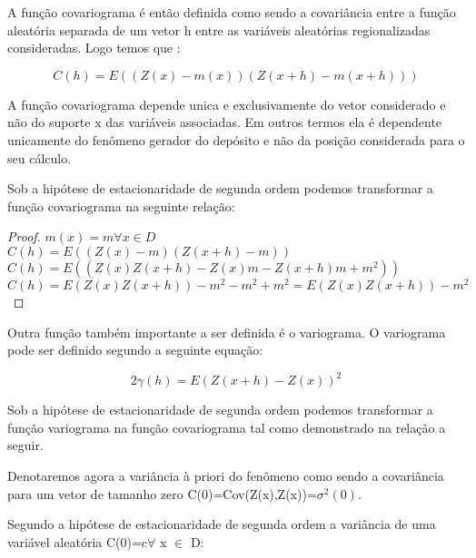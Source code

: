 A função covariograma é então definida como sendo a covariância entre a função aleatória separada de um vetor h entre as variáveis aleatórias regionalizadas consideradas. Logo temos que : 

\begin{equation}\label{eq6:Covariograma}
C\left(h\right)= E\left( (Z(x)-m(x)) (Z(x+h)-m(x+h)) \right)
\end{equation}

 A função covariograma depende unica e exclusivamente do vetor considerado e não do suporte x das variáveis associadas. Em outros termos ela é dependente unicamente do fenômeno gerador do depósito e não da posição considerada para o seu cálculo. 

Sob a hipótese de estacionaridade de segunda ordem podemos transformar a função covariograma na seguinte relação:

\begin{proof}
$ m(x) = m\forall x \in D$
\\$ C\left(h\right)= E\left( (Z(x)-m) (Z(x+h)-m) \right)$
\\$ C\left(h\right)= E\left( (Z(x)Z(x+h)-Z(x)m-Z(x+h)m+m^2) \right)$
\\$C\left(h\right)= E(Z(x)Z(x+h))-m^2-m^2+m^2=E(Z(x)Z(x+h))-m^2$
\end{proof}

Outra função também importante a ser definida é o variograma. O variograma pode ser definido segundo a seguinte equação: 

\begin{equation}\label{eq6:Variograma}
2\gamma\left(h\right)= E\left( Z(x+h)-Z(x) \right)^2
\end{equation}

Sob a hipótese de estacionaridade de segunda ordem podemos transformar a função variograma na função covariograma  tal como demonstrado na relação a seguir.

Denotaremos agora a variância à priori do fenômeno como sendo a covariância para um vetor de tamanho zero C(0)=Cov(Z(x),Z(x))=$\sigma^2(0)$. 

Segundo a hipótese de estacionaridade de segunda ordem a variância de uma variável aleatória C(0)=c$\forall$ x $\in$ D:

